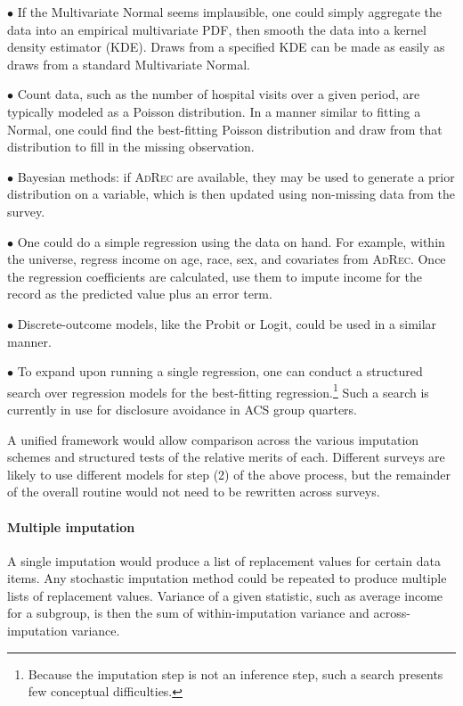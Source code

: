 \documentclass{article}
\def\adrec{\textsc{AdRec}\xspace}
\begin{document}
$\bullet$ If the Multivariate Normal seems implausible, one could simply aggregate the
data into an empirical multivariate PDF, then smooth the data into a kernel
density estimator (KDE). Draws from a specified KDE can be made as easily as
draws from a standard Multivariate Normal.

$\bullet$ Count data, such as the number of hospital visits over a given period, are
typically modeled as a Poisson distribution. In a manner similar to fitting a Normal, one
could find the best-fitting Poisson distribution and draw from that distribution to fill
in the missing observation.

$\bullet$ Bayesian methods: if \adrec are available, they may be used to generate a prior distribution 
on a variable, which is then updated using non-missing data from the survey.

$\bullet$ One could do a simple regression using the data on hand. For example,
within the universe, regress income on  age, race, sex, and covariates from \adrec.
Once the regression coefficients are calculated, use them to impute income for
the record as the predicted value plus an error term. 

$\bullet$ Discrete-outcome models, like the Probit or Logit, could be used in a similar
manner.

$\bullet$ To expand upon running a single regression, one can conduct a structured search 
over regression models for the best-fitting regression.\footnote{Because the imputation 
step is not an inference step, such a search presents few conceptual difficulties.}  
Such a search is currently in use for disclosure avoidance in ACS group quarters.

A unified framework would allow comparison across the various imputation
schemes and structured tests of the relative merits of each. Different surveys
are likely to use different models for step (2) of the above process, but the
remainder of the overall routine would not need to be rewritten across surveys.

\paragraph{Multiple imputation} A single imputation would produce a list of replacement
values for certain data items. Any stochastic imputation method could be repeated
to produce multiple lists of replacement values. Variance of a given statistic,
such as average income for a subgroup, is then the sum of within-imputation variance and
across-imputation variance.
\end{document}
